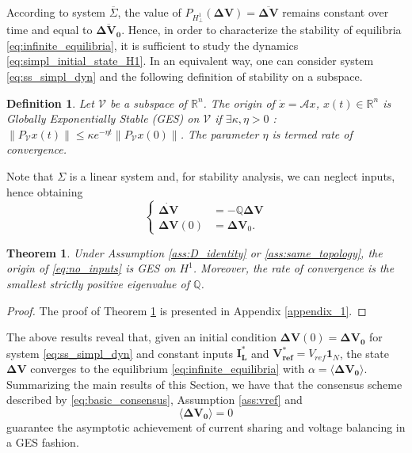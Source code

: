\documentclass[a4paper]{article}
\theoremstyle{plain}
\newtheorem{theorem}{Theorem}
\newtheorem{definition}{Definition}
\begin{document}
According to system $\overline\Sigma$, the value of $P_{H^1_{\perp}}(\mathbf{\Delta V})=\mathbf{\overline{\Delta V}}$ remains constant over time and equal to $\mathbf{\overline{\Delta V_0}}$. Hence, in order to characterize the stability of equilibria \eqref{eq:infinite_equilibria}, it is sufficient to study the dynamics \eqref{eq:simpl_initial_state_H1}. In an equivalent way, one can consider system \eqref{eq:ss_simpl_dyn} and the following definition of stability on a subspace.
\begin{definition}
	Let $\mathcal{V}$ be a subspace of $\mathbb{R}^n$. The origin of $\dot x = \mathcal{A} x$, $x(t)\in\mathbb{R}^n$ is Globally Exponentially Stable (GES) on $\mathcal{V}$ if $\exists\kappa, \eta>0$ : $\lVert P_{\mathcal{V}}x(t) \rVert\leq\kappa e^{-\eta t}\lVert P_{\mathcal{V}}x(0) \rVert$. The parameter $\eta$ is termed \textit{rate of convergence}.
\end{definition}

Note that $\Sigma$ is a linear system and, for stability analysis, we can neglect inputs, hence obtaining 
\begin{equation}
\label{eq:no_inputs}            
\left\lbrace
\begin{aligned}
\mathbf{\dot{{ \Delta V}}} &= -{ \mathbb{Q}}\mathbf{{\Delta V}}\\
\mathbf{{ \Delta V}}(0) &=\mathbf{{ \Delta V}}_0.
\end{aligned}
\right.
\end{equation}
\begin{theorem}
	\label{thm:GES_H1}
	Under Assumption \ref{ass:D_identity} or \ref{ass:same_topology}, the origin of \eqref{eq:no_inputs} is GES on $H^1$. Moreover, the rate of convergence is the smallest strictly positive eigenvalue of $\mathbb{Q}$.
\end{theorem}
\begin{proof}
	The proof of Theorem \ref{thm:GES_H1} is presented in Appendix \ref{appendix_1}.
\end{proof}
The above results reveal that, given an initial
condition $\mathbf{{ \Delta V}}(0)=\mathbf{\Delta V_0}$ for system \eqref{eq:ss_simpl_dyn}
and constant inputs $\mathbf{I^*_L}$ and
$\mathbf{V_{ref}^*}=V_{ref}\mathbf{1}_N$, the state $\mathbf{\Delta V}$
converges to the equilibrium \eqref{eq:infinite_equilibria} with $\alpha = \mathbf{\langle{\Delta V_0}\rangle}$.\\
Summarizing the main results of this Section, we have that the consensus scheme described by \eqref{eq:basic_consensus}, Assumption \ref{ass:vref} and 
\begin{equation}
\label{eq:cs_vb}
\mathbf{\langle{\Delta V_0}\rangle}=0
\end{equation}
guarantee the asymptotic achievement of current sharing and voltage balancing in a GES fashion. 
\end{document}
